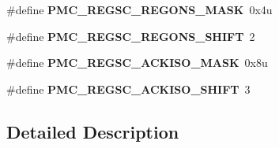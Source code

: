 \begin{DoxyCompactItemize}
\item 
\hypertarget{group___p_m_c___register___masks_gab830f2c82eef6d0db7caab8ee5689ba6}{}\#define {\bfseries P\+M\+C\+\_\+\+R\+E\+G\+S\+C\+\_\+\+R\+E\+G\+O\+N\+S\+\_\+\+M\+A\+S\+K}~0x4u\label{group___p_m_c___register___masks_gab830f2c82eef6d0db7caab8ee5689ba6}

\item 
\hypertarget{group___p_m_c___register___masks_ga06b4e6d970f2610a635c92bb1270541d}{}\#define {\bfseries P\+M\+C\+\_\+\+R\+E\+G\+S\+C\+\_\+\+R\+E\+G\+O\+N\+S\+\_\+\+S\+H\+I\+F\+T}~2\label{group___p_m_c___register___masks_ga06b4e6d970f2610a635c92bb1270541d}

\item 
\hypertarget{group___p_m_c___register___masks_ga35ced6f0f133b2d5892bdcba3e0b2832}{}\#define {\bfseries P\+M\+C\+\_\+\+R\+E\+G\+S\+C\+\_\+\+A\+C\+K\+I\+S\+O\+\_\+\+M\+A\+S\+K}~0x8u\label{group___p_m_c___register___masks_ga35ced6f0f133b2d5892bdcba3e0b2832}

\item 
\hypertarget{group___p_m_c___register___masks_gad2b9b6ce6aa455e8607fd3c2d1647544}{}\#define {\bfseries P\+M\+C\+\_\+\+R\+E\+G\+S\+C\+\_\+\+A\+C\+K\+I\+S\+O\+\_\+\+S\+H\+I\+F\+T}~3\label{group___p_m_c___register___masks_gad2b9b6ce6aa455e8607fd3c2d1647544}

\end{DoxyCompactItemize}


\subsection{Detailed Description}

